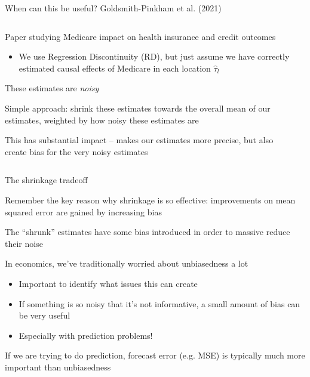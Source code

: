 \documentclass[notes,11pt, aspectratio=169]{beamer}
\newenvironment{wideitemize}{\itemize\addtolength{\itemsep}{10pt}}{\enditemize}
\begin{document}
\begin{frame}{When can this be useful? Goldsmith-Pinkham et al. (2021)}
  \begin{columns}[T] %
    \begin{column}{.5\textwidth}
  \begin{wideitemize}
  \item<1-> Paper studying Medicare impact on health insurance and credit outcomes
    \begin{itemize}
    \item We use Regression Discontinuity (RD), but just assume we
      have correctly estimated causal effects of Medicare in each
      location $\hat{\tau}_{l}$
    \end{itemize}
  \item<1-> These estimates are \emph{noisy}
  \item<2-> Simple approach: shrink these estimates towards the overall
    mean of our estimates, weighted by how noisy these estimates are
  \item<3-> This has substantial impact -- makes our estimates more precise, but also create bias for the very noisy estimates    
  \end{wideitemize}
\end{column}
\begin{column}{0.5\textwidth}
\end{column}
\end{columns}
\end{frame}

\begin{frame}{The shrinkage tradeoff}
  \begin{wideitemize}
  \item Remember the key reason why shrinkage is so effective:
    improvements on mean squared error are gained by increasing bias
  \item The ``shrunk'' estimates have some bias introduced in order to
    massive reduce their noise
  \item In economics, we've traditionally worried about unbiasedness a
    lot
    \begin{itemize}
    \item Important to identify what issues this can create
    \item If something is so noisy that it's not informative, a small
      amount of bias can be very useful
    \item Especially with prediction problems!
    \end{itemize}
  \item If we are trying to do prediction, forecast error (e.g. MSE)
    is typically much more important than unbiasedness
  \end{wideitemize}
\end{frame}
\end{document}
